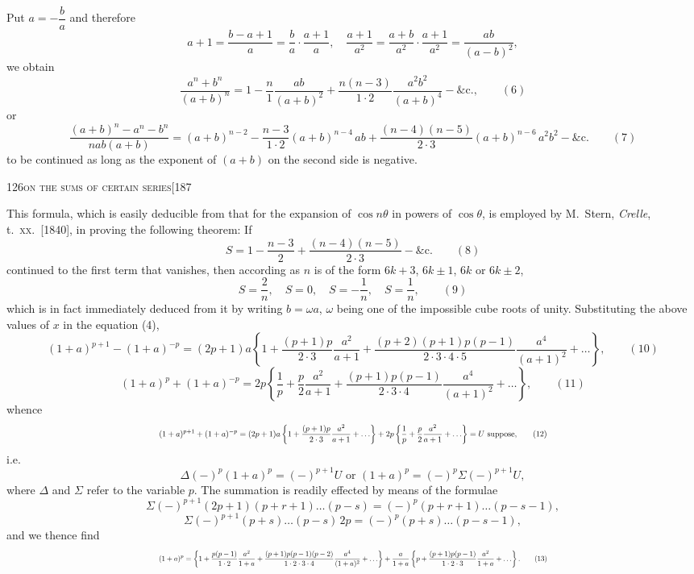 \documentclass[11pt]{article}
\begin{document}
Put $a = -\dfrac{b}{a}$ and therefore
\[
a+1 = \frac{b-a+1}{a} = \frac{b}{a} \cdot \frac{a+1}{a}, \quad \frac{a+1}{a^{2}} = \frac{a+b}{a^{2}} \cdot \frac{a+1}{a^{2}} = \frac{ab}{(a-b)^{2}},
\]
we obtain
\[
\frac{a^{n} + b^{n}}{(a+b)^{n}} = 1 - \frac{n}{1}\frac{ab}{(a+b)^{2}} + \frac{n(n-3)}{1\cdot 2}\frac{a^{2}b^{2}}{(a+b)^{4}} - \&\text{c.}, \qquad (6)
\]
or
\[
\frac{(a+b)^{n} - a^{n} - b^{n}}{nab(a+b)} = (a+b)^{n-2} - \frac{n-3}{1\cdot 2}(a+b)^{n-4}\,ab + \frac{(n-4)(n-5)}{2\cdot 3}(a+b)^{n-6}\,a^{2}b^{2} - \&\text{c.} \qquad (7)
\]
to be continued as long as the exponent of $(a+b)$ on the second side is negative.

\begin{center}\small\textsc{126}\hfill\textsc{on the sums of certain series}\hfill[187\end{center}

\noindent This formula, which is easily deducible from that for the expansion of $\cos n\theta$ in
powers of $\cos\theta$, is employed by M.\ Stern, \textit{Crelle}, t.\ \textsc{xx}.\ [1840], in proving the
following theorem: If
\[
S = 1 - \frac{n-3}{2} + \frac{(n-4)(n-5)}{2\cdot 3} - \&\text{c.} \qquad (8)
\]
continued to the first term that vanishes, then according as $n$ is of the form $6k+3$,
$6k\pm 1$, $6k$ or $6k\pm 2$,
\[
S = \frac{2}{n},\quad S = 0,\quad S = -\frac{1}{n},\quad S = \frac{1}{n}, \qquad (9)
\]
which is in fact immediately deduced from it by writing $b = \omega a$, $\omega$ being one of the
impossible cube roots of unity. Substituting the above values of $x$ in the equation (4),
\[
(1+a)^{p+1} - (1+a)^{-p} = (2p+1)a\left\{1 + \frac{(p+1)p}{2\cdot 3}\frac{a^{2}}{a+1} + \frac{(p+2)(p+1)p(p-1)}{2\cdot 3\cdot 4\cdot 5}\frac{a^{4}}{(a+1)^{2}} + \ldots\right\}, \qquad (10)
\]
\[
(1+a)^{p} + (1+a)^{-p} = 2p\left\{\frac{1}{p} + \frac{p}{2}\frac{a^{2}}{a+1} + \frac{(p+1)p(p-1)}{2\cdot 3\cdot 4}\frac{a^{4}}{(a+1)^{2}} + \ldots\right\}, \qquad (11)
\]
whence
\[ \resizebox{\textwidth}{!}{$\displaystyle
(1+a)^{p+1} + (1+a)^{-p} = (2p+1)a\left\{1 + \frac{(p+1)p}{2\cdot 3}\frac{a^{2}}{a+1} + \ldots\right\} + 2p\left\{\frac{1}{p} + \frac{p}{2}\frac{a^{2}}{a+1} + \ldots\right\} = U \text{ suppose,} \qquad (12)
$} \]
i.e.
\[
\Delta(-)^{p}(1+a)^{p} = (-)^{p+1} U \text{ or } (1+a)^{p} = (-)^{p} \Sigma(-)^{p+1} U,
\]
where $\Delta$ and $\Sigma$ refer to the variable $p$. The summation is readily effected by means
of the formulae
\[
\Sigma(-)^{p+1}(2p+1)(p+r+1)\ldots(p-s) = (-)^{p}(p+r+1)\ldots(p-s-1),
\]
\[
\Sigma(-)^{p+1}(p+s)\ldots(p-s)\,2p = (-)^{p}(p+s)\ldots(p-s-1),
\]
and we thence find
\[ \resizebox{\textwidth}{!}{$\displaystyle
(1+a)^{p} = \left\{1 + \frac{p(p-1)}{1\cdot 2}\frac{a^{2}}{1+a} + \frac{(p+1)p(p-1)(p-2)}{1\cdot 2\cdot 3\cdot 4}\frac{a^{4}}{(1+a)^{2}} + \ldots\right\}
+ \frac{a}{1+a}\left\{p + \frac{(p+1)p(p-1)}{1\cdot 2\cdot 3}\frac{a^{2}}{1+a} + \ldots\right\}. \qquad (13)
$} \]
\end{document}
